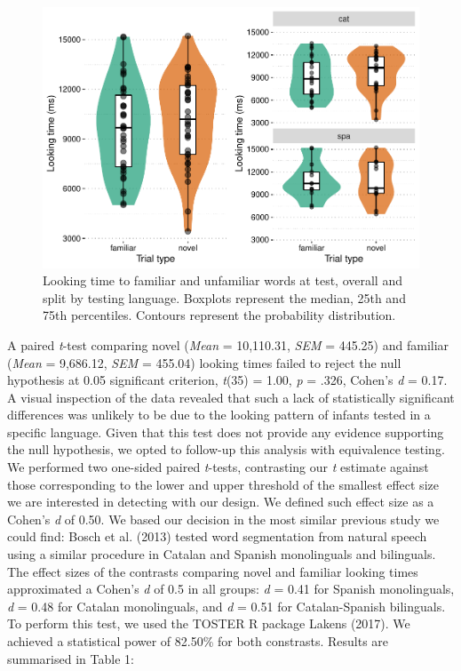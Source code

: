 \documentclass[man,floatsintext]{apa6}
\begin{document}
\begin{figure}
\centering
\includegraphics{segmentation_manuscript_files/figure-latex/unnamed-chunk-1-1.pdf}
\caption{\label{fig:unnamed-chunk-1}Looking time to familiar and unfamiliar words at test, overall and split by testing language. Boxplots represent the median, 25th and 75th percentiles. Contours represent the probability distribution.}
\end{figure}

A paired \emph{t}-test comparing novel (\emph{Mean} = 10,110.31, \emph{SEM} = 445.25) and familiar (\emph{Mean} = 9,686.12, \emph{SEM} = 455.04) looking times failed to reject the null hypothesis at 0.05 significant criterion, \emph{t}(35) = 1.00, \emph{p} = .326, Cohen's \emph{d} = 0.17. A visual inspection of the data revealed that such a lack of statistically significant differences was unlikely to be due to the looking pattern of infants tested in a specific language. Given that this test does not provide any evidence supporting the null hypothesis, we opted to follow-up this analysis with equivalence testing. We performed two one-sided paired \emph{t}-tests, contrasting our \emph{t} estimate against those corresponding to the lower and upper threshold of the smallest effect size we are interested in detecting with our design. We defined such effect size as a Cohen's \emph{d} of 0.50. We based our decision in the most similar previous study we could find: Bosch et al. (2013) tested word segmentation from natural speech using a similar procedure in Catalan and Spanish monolinguals and bilinguals. The effect sizes of the contrasts comparing novel and familiar looking times approximated a Cohen's \emph{d} of 0.5 in all groups: \emph{d} = 0.41 for Spanish monolinguals, \emph{d} = 0.48 for Catalan monolinguals, and \emph{d} = 0.51 for Catalan-Spanish bilinguals. To perform this test, we used the TOSTER R package Lakens (2017). We achieved a statistical power of 82.50\% for both constrasts. Results are summarised in Table 1:
\end{document}
